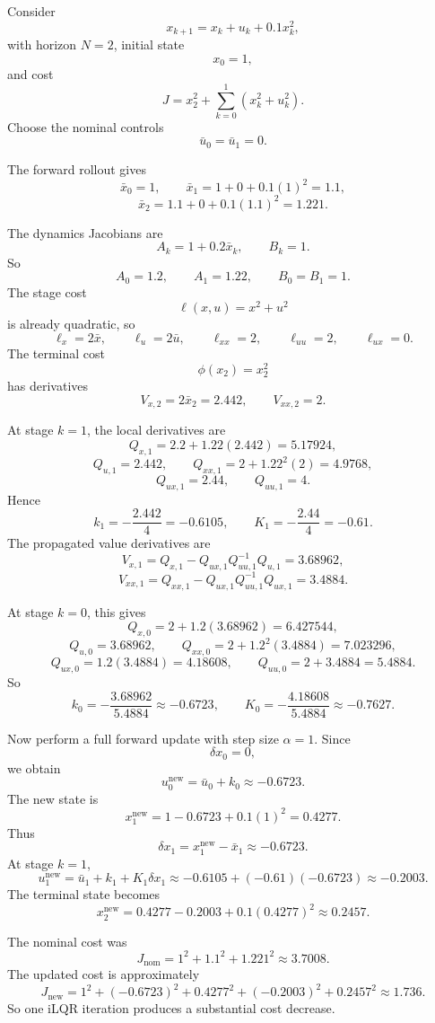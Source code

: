 \begin{eg}
	Consider
	\[
		x_{k+1}=x_k+u_k+0.1x_k^2,
	\]
	with horizon $N=2$, initial state
	\[
		x_0=1,
	\]
	and cost
	\[
		J = x_2^2 + \sum_{k=0}^{1}(x_k^2+u_k^2).
	\]
	Choose the nominal controls
	\[
		\bar u_0=\bar u_1=0.
	\]

	The forward rollout gives
	\[
		\bar x_0=1,
		\qquad
		\bar x_1=1+0+0.1(1)^2=1.1,
	\]
	\[
		\bar x_2=1.1+0+0.1(1.1)^2=1.221.
	\]

	The dynamics Jacobians are
	\[
		A_k = 1+0.2\bar x_k,
		\qquad
		B_k = 1.
	\]
	So
	\[
		A_0=1.2,
		\qquad
		A_1=1.22,
		\qquad
		B_0=B_1=1.
	\]
	The stage cost
	\[
		\ell(x,u)=x^2+u^2
	\]
	is already quadratic, so
	\[
		\ell_x=2\bar x,
		\qquad
		\ell_u=2\bar u,
		\qquad
		\ell_{xx}=2,
		\qquad
		\ell_{uu}=2,
		\qquad
		\ell_{ux}=0.
	\]
	The terminal cost
	\[
		\phi(x_2)=x_2^2
	\]
	has derivatives
	\[
		V_{x,2}=2\bar x_2 = 2.442,
		\qquad
		V_{xx,2}=2.
	\]

	At stage $k=1$, the local derivatives are
	\[
		Q_{x,1}=2.2 + 1.22(2.442)=5.17924,
	\]
	\[
		Q_{u,1}=2.442,
		\qquad
		Q_{xx,1}=2 + 1.22^2(2)=4.9768,
	\]
	\[
		Q_{ux,1}=2.44,
		\qquad
		Q_{uu,1}=4.
	\]
	Hence
	\[
		k_1=-\frac{2.442}{4}=-0.6105,
		\qquad
		K_1=-\frac{2.44}{4}=-0.61.
	\]
	The propagated value derivatives are
	\[
		V_{x,1}
		=
		Q_{x,1}-Q_{ux,1}Q_{uu,1}^{-1}Q_{u,1}
		=
		3.68962,
	\]
	\[
		V_{xx,1}
		=
		Q_{xx,1}-Q_{ux,1}Q_{uu,1}^{-1}Q_{ux,1}
		=
		3.4884.
	\]

	At stage $k=0$, this gives
	\[
		Q_{x,0}=2 + 1.2(3.68962)=6.427544,
	\]
	\[
		Q_{u,0}=3.68962,
		\qquad
		Q_{xx,0}=2 + 1.2^2(3.4884)=7.023296,
	\]
	\[
		Q_{ux,0}=1.2(3.4884)=4.18608,
		\qquad
		Q_{uu,0}=2+3.4884=5.4884.
	\]
	So
	\[
		k_0=-\frac{3.68962}{5.4884}\approx -0.6723,
		\qquad
		K_0=-\frac{4.18608}{5.4884}\approx -0.7627.
	\]

	Now perform a full forward update with step size $\alpha=1$. Since
	\[
		\delta x_0=0,
	\]
	we obtain
	\[
		u_0^{\text{new}} = \bar u_0 + k_0 \approx -0.6723.
	\]
	The new state is
	\[
		x_1^{\text{new}}
		=
		1 - 0.6723 + 0.1(1)^2
		=
		0.4277.
	\]
	Thus
	\[
		\delta x_1 = x_1^{\text{new}}-\bar x_1 \approx -0.6723.
	\]
	At stage $k=1$,
	\[
		u_1^{\text{new}}
		=
		\bar u_1 + k_1 + K_1 \delta x_1
		\approx
		-0.6105 + (-0.61)(-0.6723)
		\approx
		-0.2003.
	\]
	The terminal state becomes
	\[
		x_2^{\text{new}}
		=
		0.4277 - 0.2003 + 0.1(0.4277)^2
		\approx
		0.2457.
	\]

	The nominal cost was
	\[
		J_{\text{nom}}
		=
		1^2 + 1.1^2 + 1.221^2
		\approx
		3.7008.
	\]
	The updated cost is approximately
	\[
		J_{\text{new}}
		=
		1^2 + (-0.6723)^2 + 0.4277^2 + (-0.2003)^2 + 0.2457^2
		\approx
		1.736.
	\]
	So one iLQR iteration produces a substantial cost decrease.
\end{eg}

